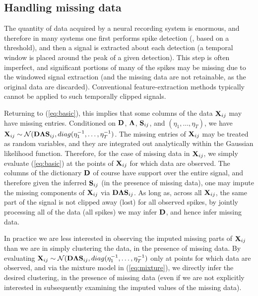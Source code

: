 \documentclass[journal]{IEEEtran}
\begin{document}
\subsection{Handling missing data} \label{sec:missing}

The quantity of data acquired by a neural recording system is enormous, and therefore in many systems one first performs spike detection (, based on a threshold), and then a signal is extracted about each detection (a temporal window is placed around the peak of a given detection). This step is often imperfect, and significant portions of many of the spikes may be missing due to the windowed signal extraction (and the missing data are not retainable, as the original data are discarded). Conventional feature-extraction methods typically cannot be applied to such temporally clipped signals.

Returning to (\ref{eq:basic}), this implies that some columns of the data ${\mathbf X}_{ij}$ may have missing entries. Conditioned on ${\mathbf D}$, $\boldsymbol{\Lambda}$, ${\mathbf S}_{ij}$, and $(\eta_1,\dots,\eta_T)$, we have ${\mathbf X}_{ij}\sim\mathcal{N}({\mathbf D}\boldsymbol{\Lambda}{\mathbf S}_{ij},\relax{diag}(\eta_1^{-1},\dots,\eta_T^{-1})$. The missing entries of ${\mathbf X}_{ij}$ may be treated as random variables, and they are integrated out analytically within the Gaussian likelihood function. Therefore, for the case of missing data in ${\mathbf X}_{ij}$, we simply evaluate (\ref{eq:basic}) at the points of ${\mathbf X}_{ij}$ for which data are observed. The columns of the dictionary ${\mathbf D}$ of course have support over the entire signal, and therefore given the inferred ${\mathbf S}_{ij}$ (in the presence of missing data), one may impute the missing components of ${\mathbf X}_{ij}$ via ${\mathbf D}\boldsymbol{\Lambda}{\mathbf S}_{ij}$. As long as, across all ${\mathbf X}_{ij}$, the same part of the signal is not clipped away (lost) for all observed spikes, by jointly processing all of the  data (all spikes) we may infer ${\mathbf D}$, and hence infer missing data.

In practice we are less interested in observing the imputed missing parts of ${\mathbf X}_{ij}$ than we are in simply clustering the data, in the presence of missing data. By evaluating ${\mathbf X}_{ij}\sim\mathcal{N}({\mathbf D}\boldsymbol{\Lambda}{\mathbf S}_{ij},\relax{diag}(\eta_1^{-1},\dots,\eta_T^{-1})$ only at points for which data are observed, and via the mixture model in (\ref{eq:mixture}), we directly infer the desired clustering, in the presence of missing data (even if we are not explicitly interested in subsequently examining the imputed values of the missing data).
\end{document}
